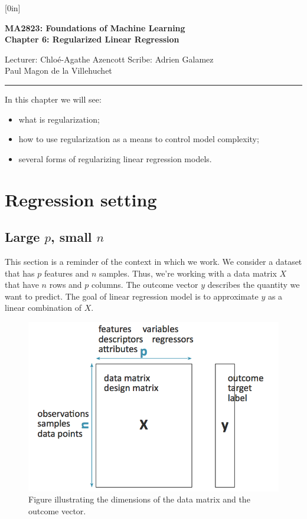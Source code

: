 \documentclass[a4paper,12pt]{article}
\begin{document}
\raisebox{0.6in}[0in]{}
\vspace{-0.7in}

\begin{center}
\bf\large MA2823: Foundations of Machine Learning \\
Chapter 6: Regularized Linear Regression
\end{center}

\noindent
Lecturer: Chlo\'e-Agathe Azencott   
\hfill
Scribe: Adrien Galamez \\
\null \hfill Paul Magon de la Villehuchet


\noindent
\rule{\textwidth}{1pt}

\medskip

In this chapter we will see:
\begin{itemize}
\item what is regularization;
\item how to use regularization as a means to control model complexity;
\item several forms of regularizing linear regression models.
\end{itemize}

\section{Regression setting}
\subsection{Large $p$, small $n$}
This section is a reminder of the context in which we work. We consider a dataset that has $p$ features and $n$ samples. Thus, we're working with a data matrix $X$ that have $n$ rows and $p$ columns. The outcome vector $y$ describes the quantity we want to predict. The goal of linear regression model is to approximate $y$ as a linear combination of $X$.
\begin{figure}[!h]
\centerline{
\includegraphics[scale = 0.3]{figures/RegressionSettings.png}}
\caption{Figure illustrating the dimensions of the data matrix and the outcome vector.}
\label{DataMatrix}
\end{figure}
\end{document}
